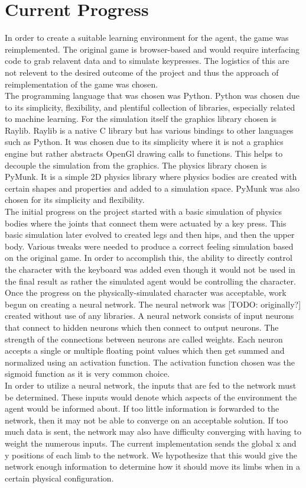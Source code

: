 \documentclass[letterpaper]{article} %
\begin{document}
\section{Current Progress}
\indent In order to create a suitable learning environment for the agent, the game was reimplemented.
The original game is browser-based and would require interfacing code to grab relavent data and to simulate keypresses.
The logistics of this are not relevent to the desired outcome of the project and thus the approach of reimplementation of the game was chosen. \\
\indent The programming language that was chosen was Python.
Python was chosen due to its simplicity, flexibility, and plentiful collection of libraries, especially related to machine learning.
For the simulation itself the graphics library chosen is Raylib.
Raylib is a native C library but has various bindings to other languages such as Python.
It was chosen due to its simplicity where it is not a graphics engine but rather abstracts OpenGl drawing calls to functions.
This helps to decouple the simulation from the graphics.
The physics library chosen is PyMunk.
It is a simple 2D physics library where physics bodies are created with certain shapes and properties and added to a simulation space.
PyMunk was also chosen for its simplicity and flexibility. \\
\indent The initial progress on the project started with a basic simulation of physics bodies where the joints that connect them were actuated by a key press.
This basic simulation later evolved to created legs and then hips, and then the upper body.
Various tweaks were needed to produce a correct feeling simulation based on the original game.
In order to accomplish this, the ability to directly control the character with the keyboard was added even though it would not be used in the final result as rather the simulated agent would be controlling the character. \\
\indent Once the progress on the physically-simulated character was acceptable, work begun on creating a neural network.
The neural network was [TODO: originally?] created without use of any libraries.
A neural network consists of input neurons that connect to hidden neurons which then connect to output neurons.
The strength of the connections between neurons are called weights.
Each neuron accepts a single or multiple floating point values which then get summed and normalized using an activation function.
The activation function chosen was the sigmoid function as it is very common choice. \\
\indent In order to utilize a neural network, the inputs that are fed to the network must be determined.
These inputs would denote which aspects of the environment the agent would be informed about.
If too little information is forwarded to the network, then it may not be able to converge on an acceptable solution.
If too much data is sent, the network may also have difficulty converging with having to weight the numerous inputs.
The current implementation sends the global x and y positions of each limb to the network.
We hypothesize that this would give the network enough information to determine how it should move its limbs when in a certain physical configuration.
\end{document}
